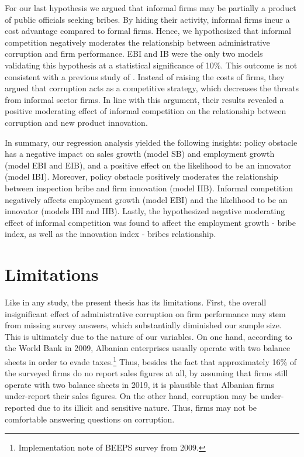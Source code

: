For our last hypothesis we argued that informal firms may be partially a product of public officials seeking bribes. By hiding their activity, informal firms incur a cost advantage compared to formal firms. Hence, we hypothesized that informal competition negatively moderates the relationship between administrative corruption and firm performance. EBI and IB were the only two models validating this hypothesis at a statistical significance of 10\%. This outcome is not consistent with a previous study of \citet{xie2019corruption}. Instead of raising the costs of firms, they argued that corruption acts as a competitive strategy, which decreases the threats from informal sector firms. In line with this argument, their results revealed a positive moderating effect of informal competition on the relationship between corruption and new product innovation.

In summary, our regression analysis yielded the following insights: policy obstacle has a negative impact on sales growth (model SB) and employment growth (model EBI and EIB), and a positive effect on the likelihood to be an innovator (model IBI). Moreover, policy obstacle positively moderates the relationship between inspection bribe and firm innovation (model IIB). Informal competition negatively affects employment growth (model EBI) and the likelihood to be an innovator (models IBI and IIB). Lastly, the hypothesized negative moderating effect of informal competition was found to affect the employment growth - bribe index, as well as the innovation index - bribes relationship. 

\section{Limitations}
Like in any study, the present thesis has its limitations.  First, the overall insignificant effect of administrative corruption on firm performance may stem from missing survey answers, which substantially diminished our sample size. This is ultimately due to the nature of our variables. On one hand, according to the World Bank in 2009, Albanian enterprises usually operate with two balance sheets in order to evade taxes.\footnote{Implementation note of BEEPS survey from 2009.} Thus, besides the fact that approximately 16\% of the surveyed firms do no report sales figures at all, by assuming that firms still operate with two balance sheets in 2019, it is plausible that Albanian firms under-report their sales figures. On the other hand, corruption may be under-reported due to its illicit and sensitive nature. Thus, firms may not be comfortable answering questions on corruption. 

